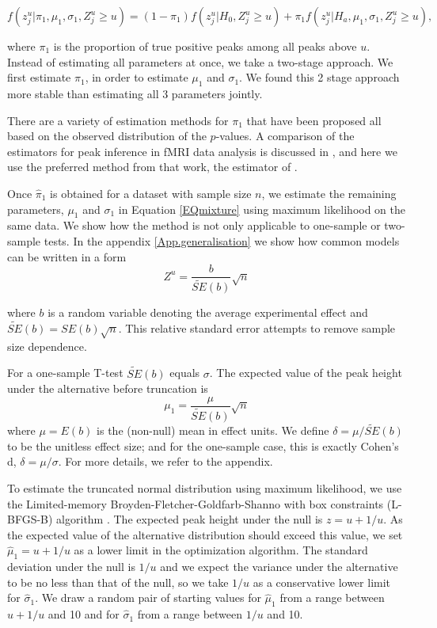 \begin{equation} \label{EQmixture}
  f(z^u_j|\pi_1,\mu_1,\sigma_1,Z^u_j\geq u) = (1-\pi_1) f(z^u_j|H_0,Z^u_j\geq u) + \pi_1 f(z^u_j|H_a,\mu_1,\sigma_1,Z^u_j \geq u),
\end{equation}


where $\pi_1$ is the proportion of true positive peaks among all peaks above $u$.  Instead of estimating all parameters at once, we take a two-stage approach.  We first estimate $\pi_1$, in order to estimate $\mu_1$ and $\sigma_1$. We found this 2 stage approach more stable than estimating all 3 parameters jointly.

There are a variety of estimation methods for $\pi_1$ that have been proposed \citep{Benjamini2000, Storey2003, Storey2001, Pounds2003, Pounds2004} all based on the observed distribution of the $p$-values. A comparison of the estimators for peak inference in fMRI data analysis is discussed in \citet{Durnez2014}, and here we use the preferred method from that work, the estimator of \citet{Pounds2003}.

Once $\hat\pi_1$ is obtained for a dataset with sample size $n$, we estimate the remaining parameters, $\mu_1$ and $\sigma_1$ in Equation \ref{EQmixture} using maximum likelihood on the same data. We show how the method is not only applicable to one-sample or two-sample tests.  In the appendix  \ref{App.generalisation} we show how common models can be written in a form
$$Z^u = \frac{b}{\widetilde{SE}(b)}\sqrt{n}$$

where $b$ is  a random variable denoting the average experimental effect and $\widetilde{SE}(b) = SE(b)\sqrt{n}$.  This relative standard error attempts to remove sample size dependence.

For a one-sample T-test $\widetilde{SE}(b)$ equals $\sigma$. The expected value of the peak height under the alternative before truncation is $$\mu_1=\frac{\mu}{\widetilde{SE}(b)}\sqrt{n}$$
where $\mu=E(b)$ is the (non-null) mean in effect units.  We define $\delta=\mu/\widetilde{SE}(b)$ to be the unitless effect size; and for the one-sample case, this is exactly Cohen's d, $\delta=\mu/\sigma$.  For more details, we refer to the appendix.

To estimate the truncated normal distribution using maximum likelihood, we use the Limited-memory Broyden-Fletcher-Goldfarb-Shanno with box constraints (L-BFGS-B) algorithm \citep{Byrd1995}.  The expected peak height under the null is $z=u+1/u$.  As the expected value of the alternative distribution should exceed this value, we set $\hat\mu_1=u+1/u$ as a lower limit in the optimization algorithm.  The standard deviation under the null is $1/u$ and we expect the variance under the alternative to be no less than that of the null, so we take $1/u$ as a conservative lower limit for $\hat\sigma_1$.  We draw a random pair of starting values for $\hat\mu_1$ from a range between $u+1/u$ and 10 and for $\hat\sigma_1$ from a range between $1/u$ and 10.


